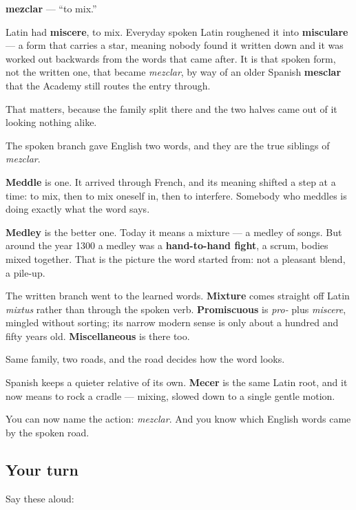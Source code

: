 \begin{cousinweb}
\textbf{mezclar} — \textquotedblleft{}to mix.\textquotedblright{}

Latin had \textbf{miscere}, to mix. Everyday spoken Latin roughened it into \textbf{misculare} — a form that carries a star, meaning nobody found it written down and it was worked out backwards from the words that came after. It is that spoken form, not the written one, that became \emph{mezclar}, by way of an older Spanish \textbf{mesclar} that the Academy still routes the entry through.

That matters, because the family split there and the two halves came out of it looking nothing alike.

The spoken branch gave English two words, and they are the true siblings of \emph{mezclar}.

\textbf{Meddle} is one. It arrived through French, and its meaning shifted a step at a time: to mix, then to mix oneself in, then to interfere. Somebody who meddles is doing exactly what the word says.

\textbf{Medley} is the better one. Today it means a mixture — a medley of songs. But around the year 1300 a medley was a \textbf{hand-to-hand fight}, a scrum, bodies mixed together. That is the picture the word started from: not a pleasant blend, a pile-up.

The written branch went to the learned words. \textbf{Mixture} comes straight off Latin \emph{mixtus} rather than through the spoken verb. \textbf{Promiscuous} is \emph{pro-} plus \emph{miscere}, mingled without sorting; its narrow modern sense is only about a hundred and fifty years old. \textbf{Miscellaneous} is there too.

Same family, two roads, and the road decides how the word looks.

Spanish keeps a quieter relative of its own. \textbf{Mecer} is the same Latin root, and it now means to rock a cradle — mixing, slowed down to a single gentle motion.
\end{cousinweb}

\begin{grammarlens}[title={What you've built}]
You can now name the action: \emph{mezclar}. And you know which English words came by the spoken road.
\end{grammarlens}

\subsection*{Your turn}
Say these aloud:

